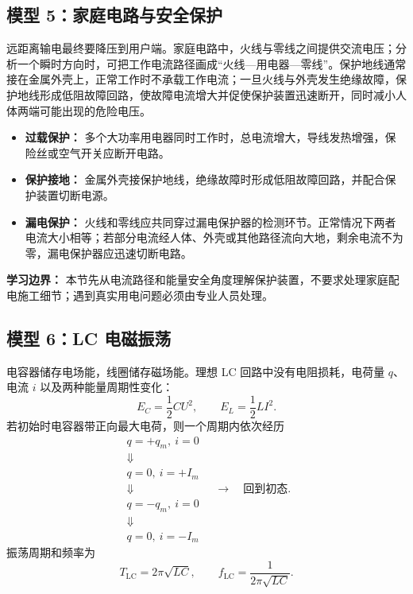 \begin{center}


\label{fig:power-transmission}
\end{center}

\subsection*{模型 5：家庭电路与安全保护}

远距离输电最终要降压到用户端。家庭电路中，火线与零线之间提供交流电压；分析一个瞬时方向时，可把工作电流路径画成“火线—用电器—零线”。保护地线通常接在金属外壳上，正常工作时不承载工作电流；一旦火线与外壳发生绝缘故障，保护地线形成低阻故障回路，使故障电流增大并促使保护装置迅速断开，同时减小人体两端可能出现的危险电压。

\begin{center}


\label{fig:home-circuit-protection}
\end{center}

\begin{itemize}
  \item \textbf{过载保护：} 多个大功率用电器同时工作时，总电流增大，导线发热增强，保险丝或空气开关应断开电路。
  \item \textbf{保护接地：} 金属外壳接保护地线，绝缘故障时形成低阻故障回路，并配合保护装置切断电源。
  \item \textbf{漏电保护：} 火线和零线应共同穿过漏电保护器的检测环节。正常情况下两者电流大小相等；若部分电流经人体、外壳或其他路径流向大地，剩余电流不为零，漏电保护器应迅速切断电路。
\end{itemize}

\textbf{学习边界：} 本节先从电流路径和能量安全角度理解保护装置，不要求处理家庭配电施工细节；遇到真实用电问题必须由专业人员处理。

\subsection*{模型 6：LC 电磁振荡}

电容器储存电场能，线圈储存磁场能。理想 LC 回路中没有电阻损耗，电荷量 $q$、电流 $i$ 以及两种能量周期性变化：
\[
E_C=\frac12CU^2,\qquad E_L=\frac12LI^2.
\]
若初始时电容器带正向最大电荷，则一个周期内依次经历
\[
\begin{array}{c}
q=+q_m,\ i=0\\
\Downarrow\\
q=0,\ i=+I_m\\
\Downarrow\\
q=-q_m,\ i=0\\
\Downarrow\\
q=0,\ i=-I_m
\end{array}
\quad\longrightarrow\quad\text{回到初态}.
\]
振荡周期和频率为
\[
\boxed{T_{\mathrm{LC}}=2\pi\sqrt{LC}},\qquad
\boxed{f_{\mathrm{LC}}=\frac{1}{2\pi\sqrt{LC}}}.
\]


